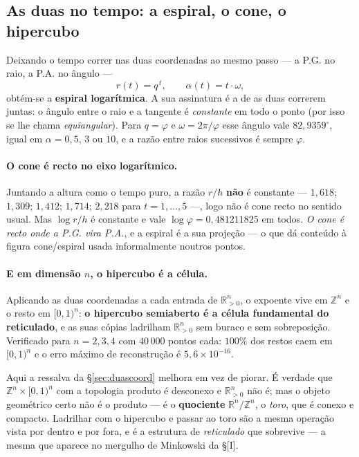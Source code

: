\documentclass[11pt,a4paper]{article}
\theoremstyle{plain}
\theoremstyle{definition}
\theoremstyle{remark}
\newcommand{\R}{\mathbb{R}}
\newcommand{\Z}{\mathbb{Z}}
\begin{document}
\subsection{As duas no tempo: a espiral, o cone, o hipercubo}\label{sec:dinamica}

Deixando o tempo correr nas duas coordenadas ao mesmo passo --- a P.G. no raio, a P.A. no ângulo ---
\[
  r(t) = q^{\,t}, \qquad \alpha(t) = t\cdot\omega ,
\]
obtém-se a \textbf{espiral logarítmica}. A sua assinatura é a de as duas correrem juntas: o ângulo
entre o raio e a tangente é \emph{constante} em todo o ponto (por isso se lhe chama
\emph{equiangular}). Para $q=\varphi$ e $\omega = 2\pi/\varphi$ esse ângulo vale $82{,}9359^\circ$,
igual em $\alpha = 0{,}5$, $3$ ou $10$, e a razão entre raios sucessivos é sempre $\varphi$.

\paragraph{O cone é recto no eixo logarítmico.} Juntando a altura como o tempo puro, a razão
$r/h$ \textbf{não} é constante --- $1{,}618$; $1{,}309$; $1{,}412$; $1{,}714$; $2{,}218$ para
$t=1,\dots,5$ ---, logo não é cone recto no sentido usual. Mas $\log r / h$ é constante e vale
$\log\varphi = 0{,}481211825$ em todos. \emph{O cone é recto onde a P.G. vira P.A.}, e a espiral é
a sua projeção --- o que dá conteúdo à figura cone/espiral usada informalmente noutros pontos.

\paragraph{E em dimensão $n$, o hipercubo é a célula.} Aplicando as duas coordenadas a cada
entrada de $\R_{>0}^n$, o expoente vive em $\Z^n$ e o resto em $[0,1)^n$: \textbf{o hipercubo
semiaberto é a célula fundamental do reticulado}, e as suas cópias ladrilham $\R_{>0}^n$ sem buraco
e sem sobreposição. Verificado para $n=2,3,4$ com $40\,000$ pontos cada: $100\%$ dos restos caem em
$[0,1)^n$ e o erro máximo de reconstrução é $5{,}6\times10^{-16}$.

Aqui a ressalva da \S\ref{sec:duascoord} melhora em vez de piorar. É verdade que
$\Z^n\times[0,1)^n$ com a topologia produto é desconexo e $\R_{>0}^n$ não é; mas o objeto
geométrico certo não é o produto --- é o \textbf{quociente} $\R^n/\Z^n$, o \emph{toro}, que é
conexo e compacto. Ladrilhar com o hipercubo e passar ao toro são a mesma operação vista por dentro
e por fora, e é a estrutura de \emph{reticulado} que sobrevive --- a mesma que aparece no mergulho
de Minkowski da \S[I].
\end{document}
